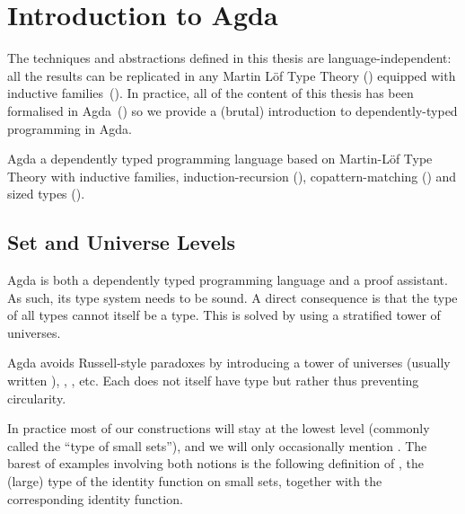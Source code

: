 \chapter{Introduction to Agda}

The techniques and abstractions defined in this thesis are language-independent:
all the results can be replicated in any Martin L\"of Type Theory
(\citeyear{martin1982constructive}) equipped with inductive
families~(\cite{dybjer1994inductive}). In practice, all of the content of this
thesis has been formalised in Agda~(\cite{norell2009dependently}) so we provide
a (brutal) introduction to dependently-typed programming in Agda.

Agda a dependently typed programming language based on Martin-L\"{o}f Type Theory
with inductive families, induction-recursion (\cite{Dybjer1999}), copattern-matching
(\cite{abelPientkaThibodeauSetzer:popl13}) and sized types
(\cite{DBLP:journals/corr/abs-1012-4896}).

\section{Set and Universe Levels}

Agda is both a dependently typed programming language and a proof assistant.
As such, its type system needs to be sound. A direct consequence is that the
type of all types cannot itself be a type. This is solved by using a stratified
tower of universes.

\begin{feature}
Agda avoids Russell-style paradoxes by introducing a tower of universes
 (usually written ), , , etc. Each
 does not itself have type  but rather  thus
preventing circularity.
\end{feature}

In practice most of our constructions will stay at the lowest level 
(commonly called the ``type of small sets''), and we will only occasionally
mention . The barest of examples involving both notions is the
following definition of , the (large) type of the identity function on
small sets, together with  the corresponding identity function.

\begin{minipage}{0.5\textwidth}
\end{minipage}\begin{minipage}{0.5\textwidth}
\end{minipage}

